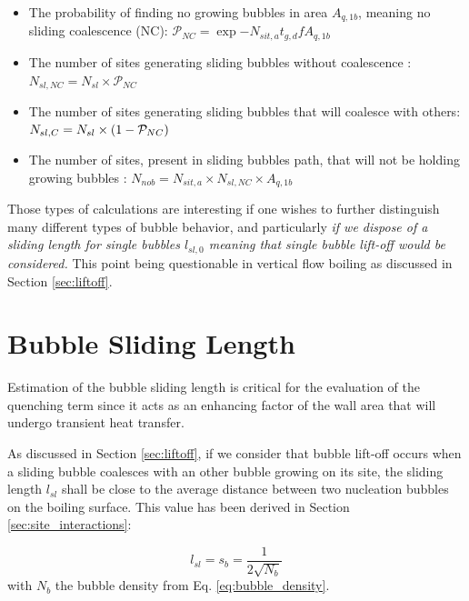 \begin{itemize}
\item The probability of finding no growing bubbles in area $A_{q,1b}$, meaning no sliding coalescence (NC): $\mathcal{P}_{NC} = \exp{-N_{sit,a}t_{g,d}f A_{q,1b}}$  
\item The number of sites generating sliding bubbles without coalescence  : $N_{sl,NC} = N_{sl} \times \mathcal{P}_{NC}$
\item The number of sites generating sliding bubbles that will coalesce with others: $N_{sl,C} = N_{sl} \times \left( 1-\mathcal{P}_{NC} \right)$
\item The number of sites, present in sliding bubbles path, that will not be holding growing bubbles : $N_{nob} = N_{sit,a} \times N_{sl,NC} \times A_{q,1b}$
\end{itemize}

Those types of calculations are interesting if one wishes to further distinguish many different types of bubble behavior, and particularly \textit{if we dispose of a sliding length for single bubbles $l_{sl,0}$ meaning that single bubble lift-off would be considered.} This point being questionable in vertical flow boiling as discussed in Section \ref{sec:liftoff}.








\section{Bubble Sliding Length}
\label{sec:sliding_length}

Estimation of the bubble sliding length is critical for the evaluation of the quenching term since it acts as an enhancing factor of the wall area that will undergo transient heat transfer.

\npar

As discussed in Section \ref{sec:liftoff}, if we consider that bubble lift-off occurs when a sliding bubble coalesces with an other bubble growing on its site, the sliding length $l_{sl}$ shall be close to the average distance between two nucleation bubbles on the boiling surface. This value has been derived in Section \ref{sec:site_interactions}:

\begin{equation}
l_{sl} = s_{b} = \frac{1}{2\sqrt{N_{b}}}
\label{eq:sliding_length}
\end{equation}
with $N_{b}$ the bubble density from Eq. \ref{eq:bubble_density}.


